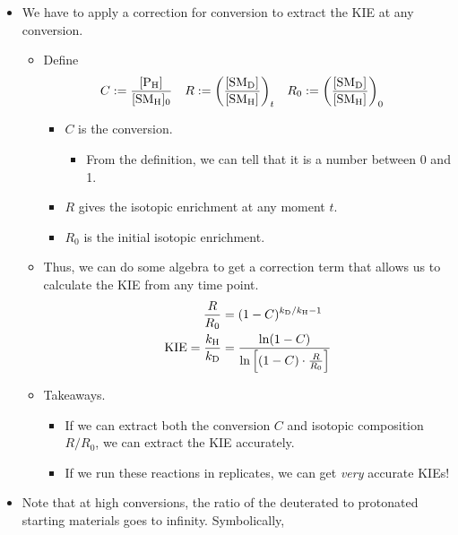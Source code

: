 \documentclass[../notes.tex]{subfiles}
\begin{document}
\begin{itemize}
\begin{itemize}
\begin{itemize}
        \end{itemize}
    \end{itemize}
    \item We have to apply a correction for conversion to extract the KIE at any conversion.
    \begin{itemize}
        \item Define
        \begin{align*}
            C &:= \frac{\cnc{P_H}}{\cnc[0]{SM_H}}&
            R &:= \left( \frac{\cnc{SM_D}}{\cnc{SM_H}} \right)_t&
            R_0 &:= \left( \frac{\cnc{SM_D}}{\cnc{SM_H}} \right)_0
        \end{align*}
        \begin{itemize}
            \item $C$ is the conversion.
            \begin{itemize}
                \item From the definition, we can tell that it is a number between 0 and 1.
            \end{itemize}
            \item $R$ gives the isotopic enrichment at any moment $t$.
            \item $R_0$ is the initial isotopic enrichment.
        \end{itemize}
        \item Thus, we can do some algebra to get a correction term that allows us to calculate the KIE from any time point.
        \begin{align*}
            \frac{R}{R_0} &= (1-C)^{k_{\ce{D}}/k_{\ce{H}}-1}\\
            \KIE = \frac{k_{\ce{H}}}{k_{\ce{D}}} &= \frac{\ln(1-C)}{\ln\left[ (1-C)\cdot\frac{R}{R_0} \right]}
        \end{align*}
        \item Takeaways.
        \begin{itemize}
            \item If we can extract both the conversion $C$ and isotopic composition $R/R_0$, we can extract the KIE accurately.
            \item If we run these reactions in replicates, we can get \emph{very} accurate KIEs!
        \end{itemize}
    \end{itemize}
    \item Note that at high conversions, the ratio of the deuterated to protonated starting materials goes to infinity. Symbolically,
    \begin{equation*}

\end{equation*}
\end{itemize}
\end{document}
